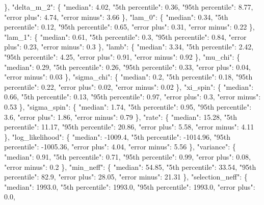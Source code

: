 {{        \}, %
        "delta\_m\_2": \{%
          "median": 4.02, %
          "5th percentile": 0.36, %
          "95th percentile": 8.77, %
          "error plus": 4.74, %
          "error minus": 3.66%
        \}, %
        "lam\_0": \{%
          "median": 0.34, %
          "5th percentile": 0.12, %
          "95th percentile": 0.65, %
          "error plus": 0.31, %
          "error minus": 0.22%
        \}, %
        "lam\_1": \{%
          "median": 0.61, %
          "5th percentile": 0.3, %
          "95th percentile": 0.84, %
          "error plus": 0.23, %
          "error minus": 0.3%
        \}, %
        "lamb": \{%
          "median": 3.34, %
          "5th percentile": 2.42, %
          "95th percentile": 4.25, %
          "error plus": 0.91, %
          "error minus": 0.92%
        \}, %
        "mu\_chi": \{%
          "median": 0.29, %
          "5th percentile": 0.26, %
          "95th percentile": 0.33, %
          "error plus": 0.04, %
          "error minus": 0.03%
        \}, %
        "sigma\_chi": \{%
          "median": 0.2, %
          "5th percentile": 0.18, %
          "95th percentile": 0.22, %
          "error plus": 0.02, %
          "error minus": 0.02%
        \}, %
        "xi\_spin": \{%
          "median": 0.66, %
          "5th percentile": 0.13, %
          "95th percentile": 0.97, %
          "error plus": 0.3, %
          "error minus": 0.53%
        \}, %
        "sigma\_spin": \{%
          "median": 1.74, %
          "5th percentile": 0.95, %
          "95th percentile": 3.6, %
          "error plus": 1.86, %
          "error minus": 0.79%
        \}, %
        "rate": \{%
          "median": 15.28, %
          "5th percentile": 11.17, %
          "95th percentile": 20.86, %
          "error plus": 5.58, %
          "error minus": 4.11%
        \}, %
        "log\_likelihood": \{%
          "median": {-}1009.4, %
          "5th percentile": {-}1014.96, %
          "95th percentile": {-}1005.36, %
          "error plus": 4.04, %
          "error minus": 5.56%
        \}, %
        "variance": \{%
          "median": 0.91, %
          "5th percentile": 0.71, %
          "95th percentile": 0.99, %
          "error plus": 0.08, %
          "error minus": 0.2%
        \}, %
        "min\_neff": \{%
          "median": 54.85, %
          "5th percentile": 33.54, %
          "95th percentile": 82.9, %
          "error plus": 28.05, %
          "error minus": 21.31%
        \}, %
        "selection\_neff": \{%
          "median": 1993.0, %
          "5th percentile": 1993.0, %
          "95th percentile": 1993.0, %
          "error plus": 0.0, %
}}
